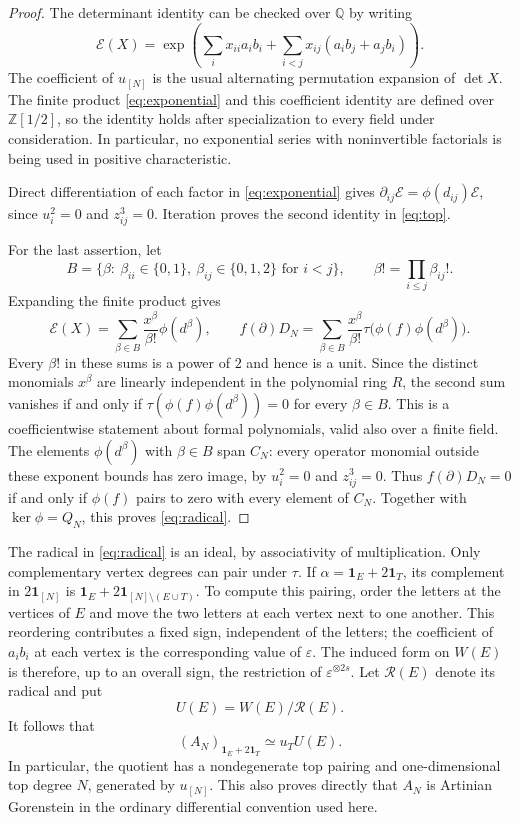 \documentclass[11pt]{article}
\theoremstyle{definition}
\theoremstyle{remark}
\numberwithin{equation}{section}
\newcommand{\one}{\mathbf{1}}
\newcommand{\set}[1]{\{#1\}}
\newcommand{\eps}{\varepsilon}
\begin{document}
\begin{proof}
The determinant identity can be checked over $\mathbb Q$ by writing
\[
 \mathcal E(X)=\exp\left(\sum_i x_{ii}a_i b_i
                   +\sum_{i<j}x_{ij}(a_i b_j+a_j b_i)\right).
\]
The coefficient of $u_{[N]}$ is the usual alternating permutation
expansion of $\det X$. The finite product \eqref{eq:exponential} and this
coefficient identity are defined over $\mathbb Z[1/2]$, so the identity
holds after specialization to every field under consideration. In
particular, no exponential series with noninvertible factorials is being
used in positive characteristic.

Direct differentiation of each factor in \eqref{eq:exponential} gives
$\partial_{ij}\mathcal E=\phi(d_{ij})\mathcal E$, since $u_i^2=0$ and
$z_{ij}^3=0$. Iteration proves the second identity in \eqref{eq:top}.

For the last assertion, let
\[
 B=\set{\beta:\ \beta_{ii}\in\{0,1\},\
                   \beta_{ij}\in\{0,1,2\}\text{ for }i<j},
 \qquad \beta!=\prod_{i\leq j}\beta_{ij}!.
\]
Expanding the finite product gives
\[
 \mathcal E(X)=\sum_{\beta\in B}
                  \frac{x^\beta}{\beta!}\phi(d^\beta),
 \qquad
 f(\partial)D_N=\sum_{\beta\in B}
     \frac{x^\beta}{\beta!}\tau\bigl(\phi(f)\phi(d^\beta)\bigr).
\]
Every $\beta!$ in these sums is a power of $2$ and hence is a unit.
Since the distinct monomials $x^\beta$ are linearly independent in
the polynomial ring $R$, the second sum vanishes if and only if
$\tau(\phi(f)\phi(d^\beta))=0$ for every $\beta\in B$. This is a
coefficientwise statement about formal polynomials, valid also over a
finite field. The elements $\phi(d^\beta)$ with $\beta\in B$ span $C_N$:
every operator monomial outside these exponent bounds has zero image,
by $u_i^2=0$ and $z_{ij}^3=0$. Thus $f(\partial)D_N=0$ if and only if
$\phi(f)$ pairs to zero with every element of $C_N$. Together with
$\ker\phi=Q_N$, this proves \eqref{eq:radical}.
\end{proof}

The radical in \eqref{eq:radical} is an ideal, by associativity of
multiplication. Only complementary vertex degrees can pair under $\tau$.
If $\alpha=\one_E+2\one_T$, its complement in $2\one_{[N]}$ is
$\one_E+2\one_{[N]\setminus(E\cup T)}$. To compute this pairing, order
the letters at the vertices of $E$ and move the two letters at each
vertex next to one another. This reordering contributes a fixed sign,
independent of the letters; the coefficient of $a_i b_i$ at each
vertex is the corresponding value of $\eps$. The induced form on
$W(E)$ is therefore, up to an overall sign, the restriction of
$\eps^{\otimes 2s}$.
Let $\mathcal R(E)$ denote its radical and put
\[
 U(E)=W(E)/\mathcal R(E).
\]
It follows that
\begin{equation}\label{eq:apolarpieces}
 (A_N)_{\one_E+2\one_T}\simeq u_TU(E).
\end{equation}
In particular, the quotient has a nondegenerate top pairing and
one-dimensional top degree $N$, generated by $u_{[N]}$. This also proves
directly that $A_N$ is Artinian Gorenstein in the ordinary differential
convention used here.
\end{document}
